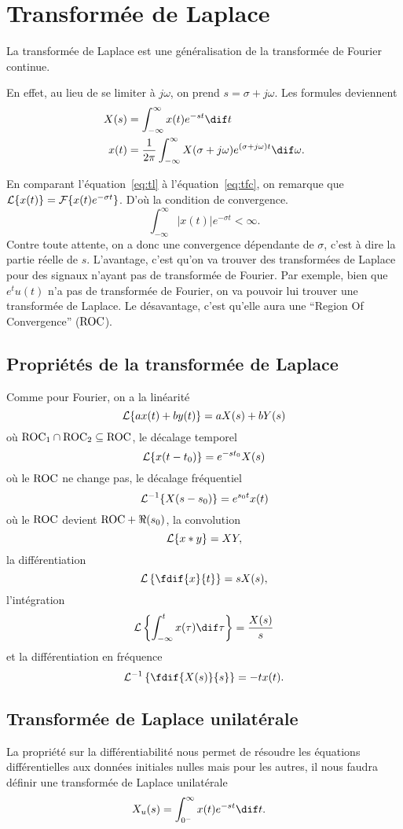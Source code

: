 \section{Transformée de Laplace}
La transformée de Laplace est une généralisation de la transformée de Fourier
continue.

En effet, au lieu de se limiter à $j\omega$, on prend $s = \sigma + j\omega$.
Les formules deviennent
\begin{align}
  \label{eq:tl}
  X(s) & = \int_{-\infty}^\infty x(t) e^{-st} \dif t\\
  \nonumber
  x(t) & = \frac{1}{2\pi}\int_{-\infty}^\infty X(\sigma+j\omega)
  e^{(\sigma+j\omega)t} \dif \omega.
\end{align}

En comparant l'équation~\ref{eq:tl} à l'équation~\ref{eq:tfc}, on remarque que
$\mathcal{L}\{x(t)\} = \mathcal{F}\{x(t) e^{-\sigma t}\}$.
D'où la condition de convergence.
\[ \int_{-\infty}^\infty |x(t)|e^{-\sigma t} < \infty. \]
Contre toute attente, on a donc une convergence dépendante de $\sigma$, c'est
à dire la partie réelle de $s$.
L'avantage, c'est qu'on va trouver des transformées de Laplace pour des
signaux n'ayant pas de transformée de Fourier.
Par exemple, bien que $e^tu(t)$ n'a pas de transformée de Fourier,
on va pouvoir lui trouver une transformée de Laplace.
Le désavantage, c'est qu'elle aura une ``Region Of Convergence'' ($\mathrm{ROC}$).

\subsection{Propriétés de la transformée de Laplace}
Comme pour Fourier, on a la linéarité
\[ \mathcal{L}\{ax(t)+by(t)\} = aX(s) + bY(s) \]
où $\mathrm{ROC}_1 \cap \mathrm{ROC}_2 \subseteq \mathrm{ROC}$,
le décalage temporel
\[ \mathcal{L}\{x(t-t_0)\} = e^{-st_0}X(s) \]
où le $\mathrm{ROC}$ ne change pas,
le décalage fréquentiel
\[ \mathcal{L}^{-1}\{X(s-s_0)\} = e^{s_0t}x(t) \]
où le $\mathrm{ROC}$ devient $\mathrm{ROC} + \Re(s_0)$,
la convolution
\[ \mathcal{L}\{x*y\} = XY, \]
la différentiation
\[ \laplace\left\{\fdif{x}{t}\right\} = sX(s), \]
l'intégration
\[ \laplace\left\{\int_{-\infty}^tx(\tau)\dif\tau\right\} = \frac{X(s)}{s} \]
et la différentiation en fréquence
\[ \laplace^{-1}\left\{\fdif{X(s)}{s}\right\} = -tx(t). \]

\subsection{Transformée de Laplace unilatérale}
\label{sec:laplacu}
La propriété sur la différentiabilité nous permet de résoudre les équations
différentielles aux données initiales nulles mais pour les autres,
il nous faudra définir une transformée de Laplace unilatérale
\begin{align*}
  X_u(s) & = \int_{0^-}^\infty x(t) e^{-st} \dif t.
\end{align*}


